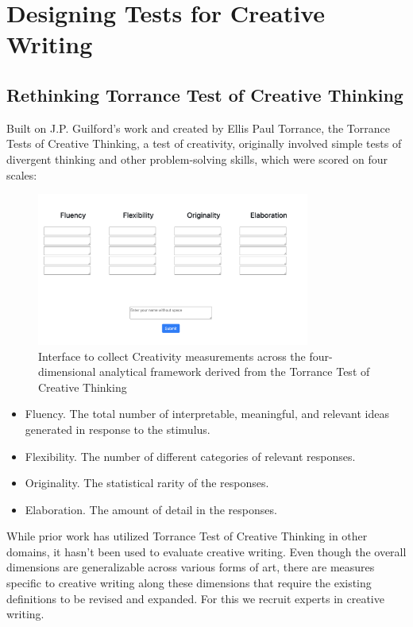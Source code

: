 \section{Designing Tests for Creative Writing} \label{sec:approach}
\subsection{Rethinking Torrance Test of Creative Thinking}
Built on J.P. Guilford's work and created by Ellis Paul Torrance, the Torrance Tests of Creative Thinking, a test of creativity, originally involved simple tests of divergent thinking and other problem-solving skills, which were scored on four scales:

\begin{figure}
\centering
\small
\includegraphics[width=0.8\textwidth]{figures/interface.png}
\caption{\label{fig:interface}Interface to collect Creativity measurements across the four-dimensional analytical framework derived from the Torrance Test of Creative Thinking}
\end{figure}

\begin{itemize}
    \item Fluency. The total number of interpretable, meaningful, and relevant ideas generated in response to the stimulus.
    \item  Flexibility. The number of different categories of relevant responses.
    \item Originality. The statistical rarity of the responses.
    \item Elaboration. The amount of detail in the responses.
\end{itemize}

While prior work \cite{10.1145/3313831.3376495,10.1145/1978942.1979048,Beketayev2016ScoringDT} has utilized Torrance Test of Creative Thinking in other domains, it hasn't been used to evaluate creative writing. Even though the overall dimensions are generalizable across various forms of art, there are measures specific to creative writing along these dimensions that require the existing definitions to be revised and expanded. For this we recruit experts in creative writing. 

